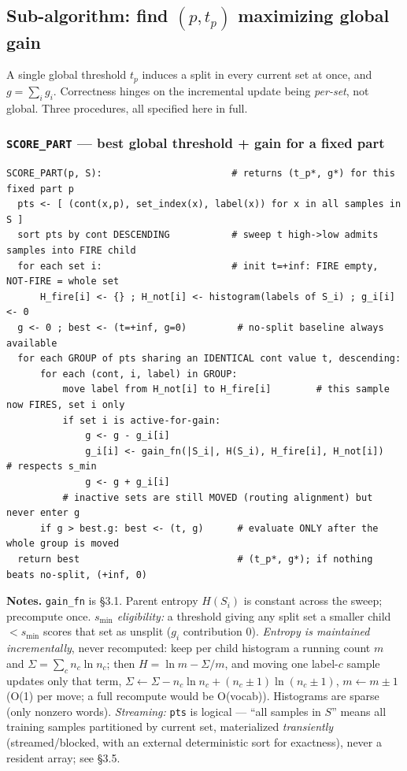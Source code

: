 \documentclass[11pt]{article}
\newcommand{\code}[1]{\texttt{#1}}
\newcommand{\gfn}{\code{gain\_fn}}
\begin{document}
\subsection{Sub-algorithm: find \texorpdfstring{$(p,t_p)$}{(p,t\_p)} maximizing global gain}
A single global threshold $t_p$ induces a split in every current set at once, and $g=\sum_i g_i$. Correctness hinges on the incremental update being \emph{per-set}, not global. Three procedures, all specified here in full.

\subsubsection{\texorpdfstring{\code{SCORE\_PART}}{SCORE\_PART} --- best global threshold + gain for a fixed part}
\begin{lstlisting}
SCORE_PART(p, S):                       # returns (t_p*, g*) for this fixed part p
  pts <- [ (cont(x,p), set_index(x), label(x)) for x in all samples in S ]
  sort pts by cont DESCENDING           # sweep t high->low admits samples into FIRE child
  for each set i:                       # init t=+inf: FIRE empty, NOT-FIRE = whole set
      H_fire[i] <- {} ; H_not[i] <- histogram(labels of S_i) ; g_i[i] <- 0
  g <- 0 ; best <- (t=+inf, g=0)         # no-split baseline always available
  for each GROUP of pts sharing an IDENTICAL cont value t, descending:
      for each (cont, i, label) in GROUP:
          move label from H_not[i] to H_fire[i]        # this sample now FIRES, set i only
          if set i is active-for-gain:
              g <- g - g_i[i]
              g_i[i] <- gain_fn(|S_i|, H(S_i), H_fire[i], H_not[i])   # respects s_min
              g <- g + g_i[i]
          # inactive sets are still MOVED (routing alignment) but never enter g
      if g > best.g: best <- (t, g)      # evaluate ONLY after the whole group is moved
  return best                            # (t_p*, g*); if nothing beats no-split, (+inf, 0)
\end{lstlisting}
\textbf{Notes.} \gfn{} is \S3.1. Parent entropy $H(S_i)$ is constant across the sweep; precompute once. \emph{$s_{\min}$ eligibility:} a threshold giving any split set a smaller child $<s_{\min}$ scores that set as unsplit ($g_i$ contribution $0$). \emph{Entropy is maintained incrementally}, never recomputed: keep per child histogram a running count $m$ and $\Sigma=\sum_c n_c\ln n_c$; then $H=\ln m-\Sigma/m$, and moving one label-$c$ sample updates only that term, $\Sigma\leftarrow\Sigma-n_c\ln n_c+(n_c{\pm}1)\ln(n_c{\pm}1)$, $m\leftarrow m{\pm}1$ (O(1) per move; a full recompute would be O(vocab)). Histograms are sparse (only nonzero words). \emph{Streaming:} \code{pts} is logical --- ``all samples in $S$'' means all training samples partitioned by current set, materialized \emph{transiently} (streamed/blocked, with an external deterministic sort for exactness), never a resident array; see \S3.5.
\end{document}
